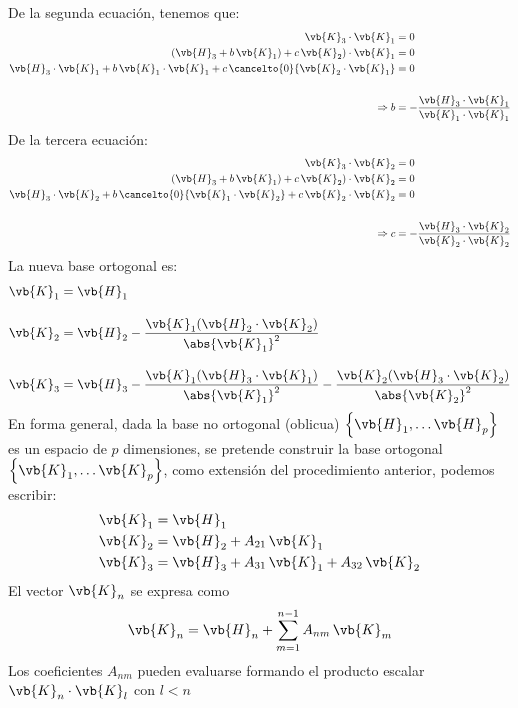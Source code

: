 De la segunda ecuación, tenemos que:
\begin{align*}
\vb{K}_{3} \cdot \vb{K}_{1} &= 0  \\
(\vb{H}_{3} + b \, \vb{K}_{1}) + c \, \vb{K}_{2}) \cdot \vb{K}_{1} &= 0 \\
\vb{H}_{3} \cdot \vb{K}_{1} + b \, \vb{K}_{1} \cdot \vb{K}_{1} + c \, \cancelto{0}{\vb{K}_{2} \cdot \vb{K}_{1}} &= 0 \\
\\
\Rightarrow b &= - \dfrac{\vb{H}_{3} \cdot \vb{K}_{1}}{\vb{K}_{1} \cdot \vb{K}_{1}}
\end{align*}
De la tercera ecuación:
\begin{align*}
\vb{K}_{3} \cdot \vb{K}_{2} &= 0  \\
(\vb{H}_{3} + b \, \vb{K}_{1}) + c \, \vb{K}_{2}) \cdot \vb{K}_{2} &= 0 \\
\vb{H}_{3} \cdot \vb{K}_{2} + b \, \cancelto{0}{\vb{K}_{1} \cdot \vb{K}_{2}} + c \, \vb{K}_{2} \cdot \vb{K}_{2} &= 0 \\
\\
\Rightarrow c &= - \dfrac{\vb{H}_{3} \cdot \vb{K}_{2}}{\vb{K}_{2} \cdot \vb{K}_{2}}
\end{align*}
La nueva base ortogonal es:
\begin{align*}
\vb{K}_{1} &= \vb{H}_{1} \\[1em]
\vb{K}_{2} &= \vb{H}_{2} - \dfrac{\vb{K}_{1} (\vb{H}_{2} \cdot \vb{K}_{2})}{\abs{\vb{K}_{1}}^{2}} \\[1em]
\vb{K}_{3} &= \vb{H}_{3} - \dfrac{\vb{K}_{1} (\vb{H}_{3} \cdot \vb{K}_{1})}{\abs{\vb{K}_{1}}^{2}} - \dfrac{\vb{K}_{2} (\vb{H}_{3} \cdot \vb{K}_{2})}{\abs{\vb{K}_{2}}^{2}} 
\end{align*}
En forma general, dada la base no ortogonal (oblicua) $\left\{ \vb{H}_{1}, \ldots \vb{H}_{p} \right\}$ es un espacio de $p$ dimensiones, se pretende construir la base ortogonal $\left\{ \vb{K}_{1}, \ldots \vb{K}_{p} \right\}$, como extensión del procedimiento anterior, podemos escribir:
\begin{align*}
\vb{K}_{1} &= \vb{H}_{1} \\
\vb{K}_{2} &= \vb{H}_{2} + A_{21} \, \vb{K}_{1} \\
\vb{K}_{3} &= \vb{H}_{3} + A_{31} \, \vb{K}_{1} + A_{32} \, \vb{K}_{2}
\end{align*}
El vector $\vb{K}_{n}$ se expresa como
\begin{align*}
\vb{K}_{n} = \vb{H}_{n} + \sum_{m=1}^{n-1} A_{nm} \, \vb{K}_{m}
\end{align*}
Los coeficientes $A_{nm}$ pueden evaluarse formando el producto escalar $\vb{K}_{n} \cdot \vb{K}_{l}$ con $l < n$
